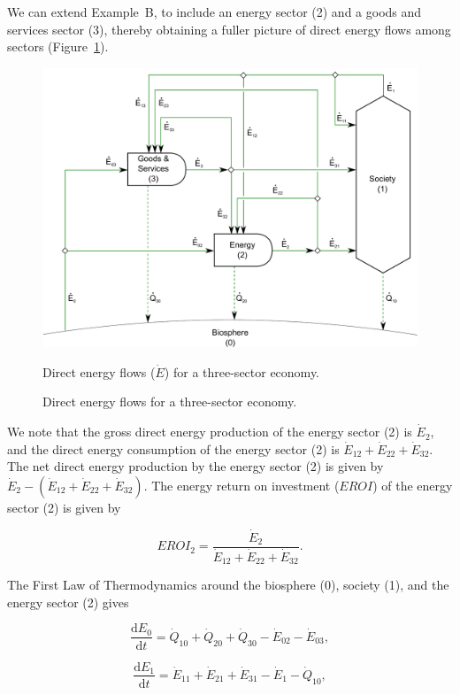We can extend Example~B, to include an energy sector (2) 
and a goods and services sector (3), thereby obtaining
a fuller picture of direct energy flows among sectors
(Figure~\ref{fig:C_energy}).

\begin{figure}[!ht]
\centering
\includegraphics[width=0.8\linewidth]{Part_2/Chapter_Energy/images/3_sector_direct_energy.pdf}
\caption{Direct energy flows for a three-sector economy.}{Direct energy flows ($\dot{E}$) for a three-sector economy.}
\label{fig:C_energy}
\end{figure}

We note that the gross direct energy production of the energy sector (2) is 
$\dot{E}_{2}$, and the direct energy consumption of the energy sector (2) is 
$\dot{E}_{12} + \dot{E}_{22} + \dot{E}_{32}$. 
The net direct energy production by the energy sector (2)
is given by $\dot{E}_{2} - (\dot{E}_{12} + \dot{E}_{22} + \dot{E}_{32})$.
The energy return on investment 
($EROI$) of the energy sector (2) is given by

\begin{equation} \label{eq:C-EROI}
	EROI_2 
	= \frac{\dot{E}_{2}}{\dot{E}_{12} + \dot{E}_{22} + \dot{E}_{32}}.
\end{equation}

The First Law of Thermodynamics around the 
biosphere (0), society (1), and the energy sector (2) gives

\begin{equation} \label{eq:C-CV_E_dot_0}
	\frac{\mathrm{d}E_{0}}{\mathrm{d}t} 	 
	= \dot{Q}_{10} 
	+ \dot{Q}_{20} 
	+ \dot{Q}_{30} 
	- \dot{E}_{02} 
	- \dot{E}_{03},
\end{equation}

\begin{equation} \label{eq:C-CV_E_dot_1}
	\frac{\mathrm{d}E_{1}}{\mathrm{d}t}
	= \dot{E}_{11}
	+ \dot{E}_{21}  
	+ \dot{E}_{31} 
	- \dot{E}_{1}
	- \dot{Q}_{10},
\end{equation}

